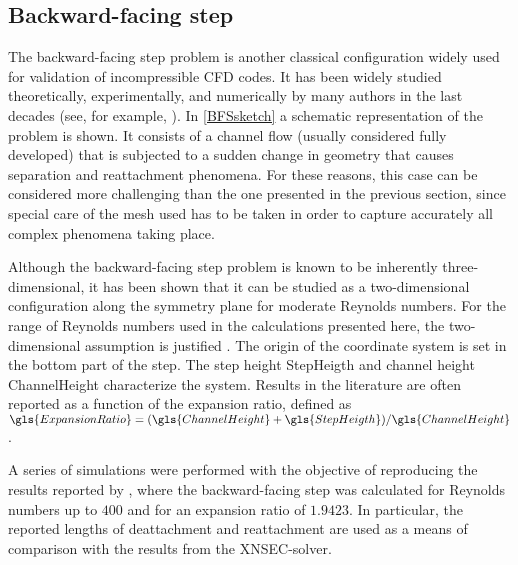 
\subsection{Backward-facing step}\label{ssec:BackwardFacingStep}
The backward-facing step problem is another classical configuration widely used for validation of incompressible CFD codes. It has been widely studied theoretically, experimentally, and numerically by many authors in the last decades (see, for example, \cite{armalyExperimentalTheoreticalInvestigation1983,barkleyThreedimensionalInstabilityFlow2000,biswasBackwardFacingStepFlows2004} ).  In \cref{BFSsketch} a schematic representation of the problem is shown. It consists of a channel flow (usually considered fully developed) that is subjected to a sudden change in geometry that causes separation and reattachment phenomena. For these reasons, this case can be considered more challenging than the one presented in the previous section, since special care of the mesh used has to be taken in order to capture accurately all complex phenomena taking place.

Although the backward-facing step problem is known to be inherently three-dimensional, it has been shown that it can be studied as a two-dimensional configuration along the symmetry plane for moderate Reynolds numbers. For the range of Reynolds numbers used in the calculations presented here, the two-dimensional assumption is justified \citep{barkleyThreedimensionalInstabilityFlow2000, biswasBackwardFacingStepFlows2004}.  The origin of the coordinate system is set in the bottom part of the step. The step height \gls{StepHeigth} and channel height \gls{ChannelHeight} characterize the system. Results in the literature are often reported as a function of the expansion ratio, defined as $\gls{ExpansionRatio} = (\gls{ChannelHeight}+\gls{StepHeigth})/\gls{ChannelHeight}$.

A series of simulations were performed with the objective of reproducing the results reported by \cite{biswasBackwardFacingStepFlows2004}, where the backward-facing step was calculated for Reynolds numbers up to $400$ and for an expansion ratio of $1.9423$. In particular, the reported lengths of deattachment and reattachment are used as a means of comparison with the results from the XNSEC-solver.

